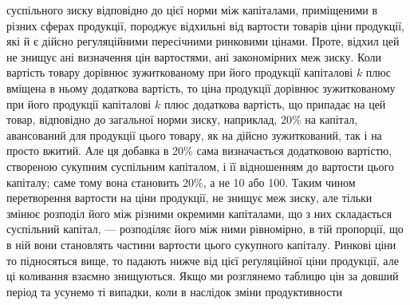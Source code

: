 суспільного зиску відповідно до цієї норми між капіталами, приміщеними в різних
сферах продукції, породжує відхильні від вартости товарів ціни продукції,
які й є дійсно регуляційними пересічними ринковими цінами. Проте, відхил цей
не знищує ані визначення цін вартостями, ані закономірних меж зиску. Коли
вартість товару дорівнює зужиткованому при його продукції капіталові $k$ плюс
вміщена в ньому додаткова вартість, то ціна продукції дорівнює зужиткованому
при його продукції капіталові $k$ плюс додаткова вартість, що припадає на цей
товар, відповідно до загальної норми зиску, наприклад, 20\% на капітал, авансований
для продукції цього товару, як на дійсно зужиткований, так і на просто
вжитий. Але ця добавка в 20\% сама визначається додатковою вартістю, створеною
сукупним суспільним капіталом, і її відношенням до вартости цього капіталу;
саме тому вона становить 20\%, а не 10 або 100. Таким чином перетворення
вартости на ціни продукції, не знищує меж зиску, але тільки змінює
розподіл його між різними окремими капіталами, що з них складається суспільний
капітал, — розподіляє його між ними рівномірно, в тій пропорції, що в ній
вони становлять частини вартости цього сукупного капіталу. Ринкові ціни
то підносяться вище, то падають нижче від цієї реґуляційної ціни продукції,
але ці коливання взаємно знищуються. Якщо ми розглянемо таблицю цін за
довший період та усунемо ті випадки, коли в наслідок зміни продуктивности
\parbreak{}  %
